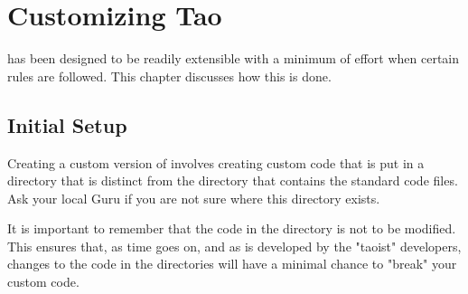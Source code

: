 \chapter{Customizing Tao}
\label{c:custom.tao}

\tao has been designed to be readily extensible with a minimum of
effort when certain rules are followed. 
This chapter discusses how this is done.

\section{Initial Setup}

Creating a custom version of \tao involves creating custom code that
is put in a directory that is distinct from the  directory that
contains the standard \tao code files. Ask your local Guru if you
are not sure where this directory exists. 

It is important to
remember that the code in the  directory is not to be modified.
This ensures that, as time goes on, and as \tao is developed by the 
"taoist" developers, changes to the code in the  directories
will have a minimal chance to "break" your custom code.

